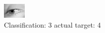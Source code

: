 \begin{figure}[h!]
\begin{center}
\includegraphics[width=0.60\columnwidth]{figures/ID3059_class_3_target_4.png}
\end{center}
\caption{ Classification: 3 actual target: 4}
\label{fig:ID3059_class_3_target_4}
\end{figure}
